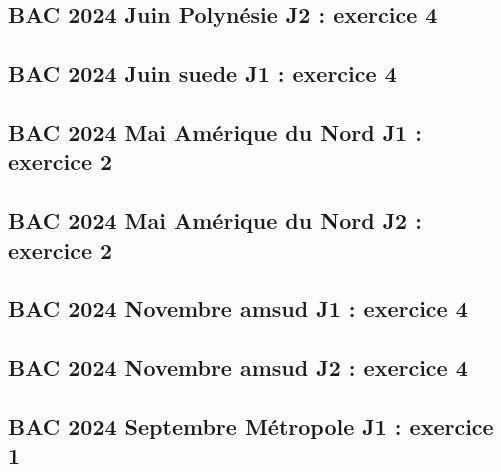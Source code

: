 \documentclass[lang=fr,edition=teacher,layout=sheet]{mxbook}
\begin{document}
\begingroup\endgroup
\par\bigskip
{}\subsection*{BAC 2024 Juin Polynésie J2 : exercice 4}
\begingroup\endgroup
\par\bigskip
{}\subsection*{BAC 2024 Juin suede J1 : exercice 4}
\begingroup\endgroup
\par\bigskip
{}\subsection*{BAC 2024 Mai Amérique du Nord J1 : exercice 2}
\begingroup\endgroup
\par\bigskip
{}\subsection*{BAC 2024 Mai Amérique du Nord J2 : exercice 2}
\begingroup\endgroup
\par\bigskip
{}\subsection*{BAC 2024 Novembre amsud J1 : exercice 4}
\begingroup\endgroup
\par\bigskip
{}\subsection*{BAC 2024 Novembre amsud J2 : exercice 4}
\begingroup\endgroup
\par\bigskip
{}\subsection*{BAC 2024 Septembre Métropole J1 : exercice 1}
\end{document}
